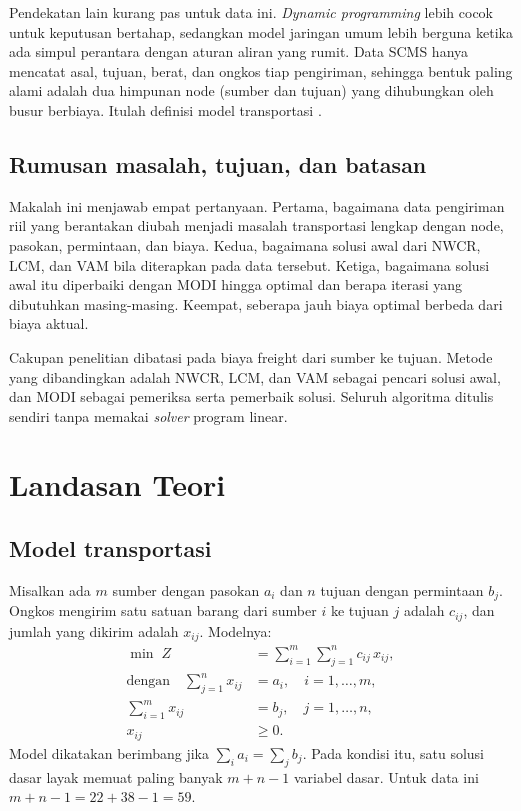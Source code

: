 \documentclass[a4paper,11pt]{article}
\begin{document}
Pendekatan lain kurang pas untuk data ini. \textit{Dynamic programming} lebih cocok untuk keputusan bertahap, sedangkan model jaringan umum lebih berguna ketika ada simpul perantara dengan aturan aliran yang rumit. Data SCMS hanya mencatat asal, tujuan, berat, dan ongkos tiap pengiriman, sehingga bentuk paling alami adalah dua himpunan node (sumber dan tujuan) yang dihubungkan oleh busur berbiaya. Itulah definisi model transportasi \cite{hitchcock1941,koopmans1949}.

\subsection{Rumusan masalah, tujuan, dan batasan}
Makalah ini menjawab empat pertanyaan. Pertama, bagaimana data pengiriman riil yang berantakan diubah menjadi masalah transportasi lengkap dengan node, pasokan, permintaan, dan biaya. Kedua, bagaimana solusi awal dari NWCR, LCM, dan VAM bila diterapkan pada data tersebut. Ketiga, bagaimana solusi awal itu diperbaiki dengan MODI hingga optimal dan berapa iterasi yang dibutuhkan masing-masing. Keempat, seberapa jauh biaya optimal berbeda dari biaya aktual.

Cakupan penelitian dibatasi pada biaya freight dari sumber ke tujuan. Metode yang dibandingkan adalah NWCR, LCM, dan VAM sebagai pencari solusi awal, dan MODI sebagai pemeriksa serta pemerbaik solusi. Seluruh algoritma ditulis sendiri tanpa memakai \textit{solver} program linear.

\section{Landasan Teori}
\label{sec:teori}

\subsection{Model transportasi}
Misalkan ada $m$ sumber dengan pasokan $a_i$ dan $n$ tujuan dengan permintaan $b_j$. Ongkos mengirim satu satuan barang dari sumber $i$ ke tujuan $j$ adalah $c_{ij}$, dan jumlah yang dikirim adalah $x_{ij}$. Modelnya:
\begin{subequations}\label{eq:model}
\begin{align}
\min\; Z &= \sum_{i=1}^{m}\sum_{j=1}^{n} c_{ij}\,x_{ij}, \label{eq:obj}\\
\text{dengan}\quad \sum_{j=1}^{n} x_{ij} &= a_i, \quad i=1,\dots,m, \label{eq:sup}\\
\sum_{i=1}^{m} x_{ij} &= b_j, \quad j=1,\dots,n, \label{eq:dem}\\
x_{ij} &\ge 0 .\label{eq:nn}
\end{align}
\end{subequations}
Model dikatakan berimbang jika $\sum_i a_i=\sum_j b_j$. Pada kondisi itu, satu solusi dasar layak memuat paling banyak $m+n-1$ variabel dasar. Untuk data ini $m+n-1=22+38-1=59$.
\end{document}
